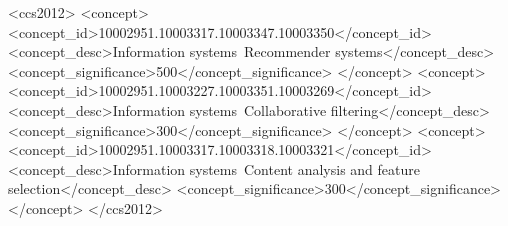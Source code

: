 \documentclass[acmart,,natbib=true,anonymous=false]{acmart}
\begin{document}
\begin{CCSXML}
<ccs2012>
   <concept>
       <concept_id>10002951.10003317.10003347.10003350</concept_id>
       <concept_desc>Information systems~Recommender systems</concept_desc>
       <concept_significance>500</concept_significance>
    </concept>
    <concept>
        <concept_id>10002951.10003227.10003351.10003269</concept_id>
        <concept_desc>Information systems~Collaborative filtering</concept_desc>
        <concept_significance>300</concept_significance>
    </concept>
   <concept>
       <concept_id>10002951.10003317.10003318.10003321</concept_id>
       <concept_desc>Information systems~Content analysis and feature selection</concept_desc>
       <concept_significance>300</concept_significance>
    </concept>
 </ccs2012>
\end{CCSXML}




\maketitle

% 













\appendix
\begin{appendices}

\end{appendices}
\end{document}
